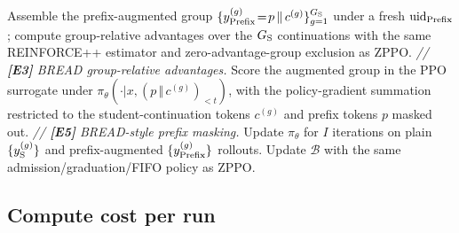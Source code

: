 \documentclass{llmxive}
\begin{document}
\begin{algorithm*}[!htbp]
{{        Assemble the prefix-augmented group $\{y_{\rm Prefix}^{(g)}\!=\!p\,\Vert\,c^{(g)}\}_{g=1}^{G_{\rm S}}$ under a fresh $\mathrm{uid}_{\rm Prefix}$; compute group-relative advantages over the $G_{\rm S}$ continuations with the same REINFORCE++ estimator and zero-advantage-group exclusion as ZPPO. \textit{// \textbf{[E3]} BREAD group-relative advantages.}\;
        Score the augmented group in the PPO surrogate under $\pi_\theta(\cdot|x, (p\,\Vert\,c^{(g)})_{<t})$, with the policy-gradient summation restricted to the student-continuation tokens $c^{(g)}$ and prefix tokens $p$ masked out. \textit{// \textbf{[E5]} BREAD-style prefix masking.}\;
    }
}
Update $\pi_\theta$ for $I$ iterations on plain $\{y_{\rm S}^{(g)}\}$ and prefix-augmented $\{y_{\rm Prefix}^{(g)}\}$ rollouts.\;
Update $\mathcal{B}$ with the same admission/graduation/FIFO policy as ZPPO.\;
\caption{Prefix training step. Steps are tagged with the BREAD~\citep{zhang2025bread} (E1--E5) and StepHint~\citep{zhang2025stephint} (F1--F3) component each inherits, including BREAD-style teacher-prefix masking from the policy loss (E5). EAS is omitted and the prefix fraction is fixed at $\alpha\!=\!0.4$. Teacher rollouts are drawn online on $X_{\rm aug}$ only, and each prefix-augmented question contributes a $G_{\rm S}$-sized group sharing the same prefix, scored with group-relative advantages identical to ZPPO/BCQ/NCQ.}
\label{alg:prefix}
\end{algorithm*}

\subsection{Compute cost per run}
\label{sec:appendix:hyperparameters:compute}
\end{document}
